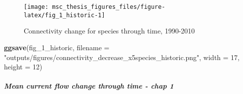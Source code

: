 \documentclass[
]{article}
\newenvironment{Shaded}{\begin{snugshade}}{\end{snugshade}}
\newcommand{\DataTypeTok}[1]{\textcolor[rgb]{0.13,0.29,0.53}{#1}}
\newcommand{\DecValTok}[1]{\textcolor[rgb]{0.00,0.00,0.81}{#1}}
\newcommand{\KeywordTok}[1]{\textcolor[rgb]{0.13,0.29,0.53}{\textbf{#1}}}
\newcommand{\NormalTok}[1]{#1}
\newcommand{\StringTok}[1]{\textcolor[rgb]{0.31,0.60,0.02}{#1}}
\begin{document}
\begin{figure}
\texttt{[image: msc\_thesis\_figures\_files/figure-latex/fig\_1\_historic-1]} \caption{Connectivity change for species through time, 1990-2010}\label{fig:fig_1_historic}
\end{figure}

\begin{Shaded}
\begin{Highlighting}[]
\KeywordTok{ggsave}\NormalTok{(fig_}\DecValTok{1}\NormalTok{_historic,}
       \DataTypeTok{filename =} \StringTok{"outputs/figures/connectivity_decrease_x5species_historic.png"}\NormalTok{,}
       \DataTypeTok{width =} \DecValTok{17}\NormalTok{, }\DataTypeTok{height =} \DecValTok{12}\NormalTok{)}
\end{Highlighting}
\end{Shaded}

\hypertarget{mean-current-flow-change-through-time---chap-1}{%
\subparagraph{Mean current flow change through time - chap
1}\label{mean-current-flow-change-through-time---chap-1}}
\end{document}

